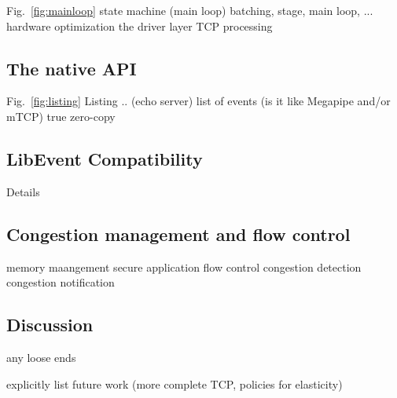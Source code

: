 %

\todo   Fig.~\ref{fig:mainloop} state machine (main loop)
\todo   batching, stage, main loop, ...
\todo   hardware optimization
\todo   the driver layer
\todo   TCP processing
     
\subsection{The \ix native API}
\label{sec:impl:api}


\todo Fig.~\ref{fig:listing} Listing .. (echo server)
\todo list of events (is it like Megapipe and/or mTCP)
\todo  true zero-copy

\subsection{LibEvent Compatibility}
\label{sec:impl:libix}
\todo Details 


\subsection{Congestion management and flow control}
\label{sec:impl:net}

\todo memory maangement
\todo secure application flow control
\todo congestion detection
\todo congestion notification

\subsection{Discussion}
\label{sec:impl:discussion}

\todo any loose ends

\todo explicitly list future work (more complete TCP, policies for elasticity)


